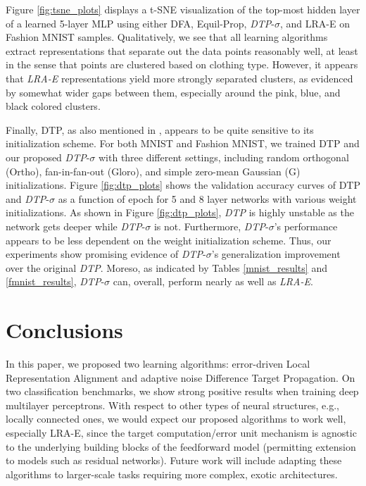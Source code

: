 \documentclass[letterpaper]{article} %
\begin{document}
Figure \ref{fig:tsne_plots} displays a t-SNE \cite{maaten2008visualizing} visualization of the top-most hidden layer of a learned 5-layer MLP using either DFA, Equil-Prop, \emph{DTP}-$\sigma$, and LRA-E on Fashion MNIST samples. Qualitatively, we see that all learning algorithms extract representations that separate out the data points reasonably well, at least in the sense that points are clustered based on clothing type. However, it appears that \emph{LRA-E} representations yield more strongly separated clusters, as evidenced by somewhat wider gaps between them, especially around the pink, blue, and black colored clusters.

Finally, DTP, as also mentioned in \cite{ororbia2018conducting}, appears to be quite sensitive to its initialization scheme. For both MNIST and Fashion MNIST, we trained DTP and our proposed \emph{DTP}-$\sigma$ with three different settings, including random orthogonal (Ortho), fan-in-fan-out (Gloro), and simple zero-mean Gaussian (G) initializations. Figure \ref{fig:dtp_plots} shows the validation accuracy curves of DTP and \textit{DTP}-$\sigma$ as a function of epoch for 5 and 8 layer networks 
with various weight initializations. As shown in Figure \ref{fig:dtp_plots}, \emph{DTP} is highly unstable as the network gets deeper while \emph{DTP}-$\sigma$ is not. Furthermore, \emph{DTP}-$\sigma$'s performance appears to be less dependent on the weight initialization scheme.
Thus, our experiments show promising evidence of \emph{DTP}-$\sigma$'s generalization improvement over the original \emph{DTP}. Moreso, as indicated by Tables \ref{mnist_results} and \ref{fmnist_results}, \emph{DTP}-$\sigma$ can, overall, perform nearly as well as \emph{LRA-E}.


\section{Conclusions}
\label{conc}
In this paper, we proposed two learning algorithms: error-driven Local Representation Alignment and adaptive noise Difference Target Propagation. On two classification benchmarks, we show strong positive results when training deep multilayer perceptrons. 
With respect to other types of neural structures, e.g., locally connected ones, we would expect our proposed algorithms to work well, especially LRA-E, since the target computation/error unit mechanism is agnostic to the underlying building blocks of the feedforward model (permitting extension to models such as residual networks).
Future work will include adapting these algorithms to larger-scale tasks requiring more complex, exotic architectures.
\end{document}
